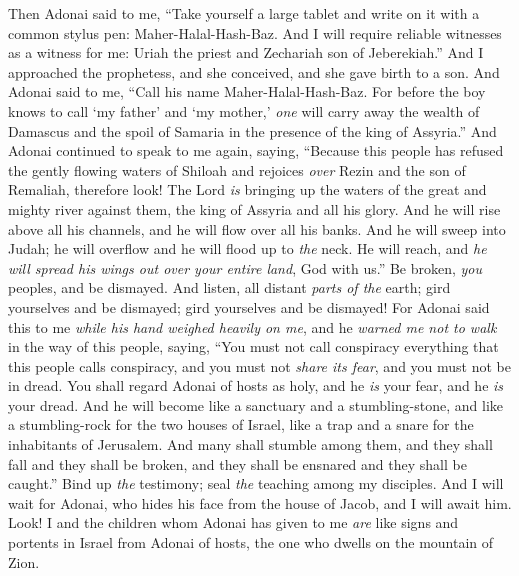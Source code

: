 \begin{biblechapter} %
 Then Adonai said to me, “Take yourself a large tablet and write on it with a common stylus pen: Maher-Halal-Hash-Baz.
\verse And I will require reliable witnesses as a witness for me: Uriah the priest and Zechariah son of Jeberekiah.”
\verse And I approached the prophetess, and she conceived, and she gave birth to a son. And Adonai said to me, “Call his name Maher-Halal-Hash-Baz.
\verse For before the boy knows to call ‘my father’ and ‘my mother,’ \textit{one} will carry away the wealth of Damascus and the spoil of Samaria in the presence of the king of Assyria.”
 And Adonai continued to speak to me again, saying,
\verse “Because this people has refused the gently flowing waters of Shiloah and rejoices \textit{over} Rezin and the son of Remaliah,
\verse therefore look! The Lord \textit{is} bringing up the waters of the great and mighty river against them, the king of Assyria and all his glory.
\verse And he will rise above all his channels, 
and he will flow over all his banks.
\verse And he will sweep into Judah; 
he will overflow and he will flood up to \textit{the} neck. 
He will reach, and \textit{he will spread his wings out over your entire land}, God with us.”
\verse Be broken, \textit{you} peoples, and be dismayed. 
And listen, all distant \textit{parts of the} earth; 
gird yourselves and be dismayed; 
gird yourselves and be dismayed!
 For Adonai said this to me \textit{while his hand weighed heavily on me}, 
and he \textit{warned me not to walk} in the way of this people, saying,
\verse “You must not call conspiracy everything that this people calls conspiracy, 
and you must not \textit{share its fear}, and you must not be in dread.
\verse You shall regard Adonai of hosts as holy, 
and he \textit{is} your fear, and he \textit{is} your dread.
\verse And he will become like a sanctuary and a stumbling-stone, 
and like a stumbling-rock for the two houses of Israel, 
like a trap and a snare for the inhabitants of Jerusalem.
\verse And many shall stumble among them, 
and they shall fall and they shall be broken, 
and they shall be ensnared and they shall be caught.”
\verse Bind up \textit{the} testimony; 
seal \textit{the} teaching among my disciples.
\verse And I will wait for Adonai, 
who hides his face from the house of Jacob, 
and I will await him.
\verse Look! I and the children whom Adonai has given to me \textit{are} like signs and portents in Israel from Adonai of hosts, the one who dwells on the mountain of Zion.

\end{biblechapter}
